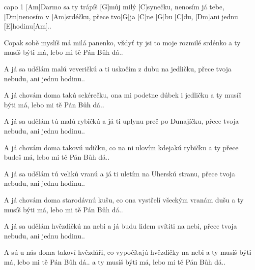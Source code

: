 
capo 1
[Am]Darmo sa ty trápíš [G]můj milý [C]synečku,
nenosím já tebe, [Dm]nenosím v [Am]srdéčku,
přece tvo[G]ja [C]ne [G]bu [C]du, 
[Dm]ani jednu [E]hodinu[Am]..

Copak sobě myslíš má milá panenko,
vždyť ty jsi to moje rozmilé srdénko
a ty musíš býti má, lebo mi tě Pán Bůh dá..

A já sa udělám malú veveričkú
a ti uskočím z dubu na jedličku,
přece tvoja nebudu, ani jednu hodinu..

A já chovám doma takú sekérečku,
ona mi podetne dúbek i jedličku
a ty musíš býti má, lebo mi tě Pán Bůh dá..

A já sa udělám tú malú rybičkú
a já ti uplynu preč po Dunajíčku,
přece tvoja nebudu, ani jednu hodinu..

A já chovám doma takovú udičku,
co na ni ulovím kdejakú rybičku
a ty přece budeš má, lebo mi tě Pán Bůh dá..

A já sa udělám tú velikú vranú
a já ti uletím na Uherskú stranu,
přece tvoja nebudu, ani jednu hodinu..

A já chovám doma starodávnú kušu,
co ona vystřelí všeckým vranám dušu
a ty musíš býti má, lebo mi tě Pán Bůh dá..

A já sa udělám hvězdičkú na nebi
a já budu lidem svítiti na nebi,
přece tvoja nebudu, ani jednu hodinu..

A sú u nás doma takoví hvězdáři,
co vypočítajú hvězdičky na nebi
a ty musíš býti má, lebo mi tě Pán Bůh dá..
a ty musíš býti má, lebo mi tě Pán Bůh dá..
